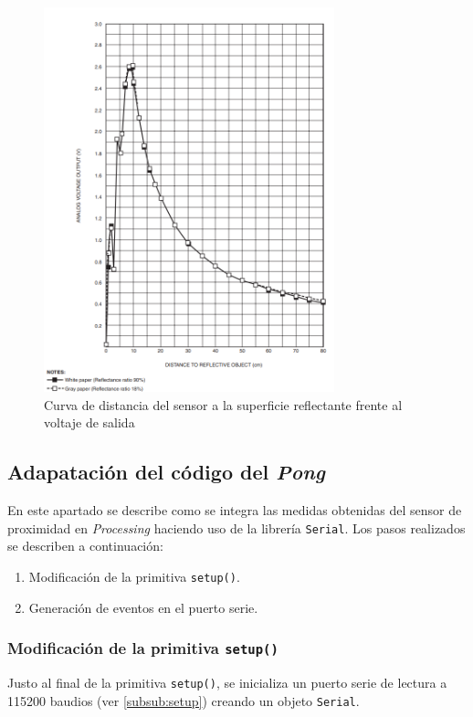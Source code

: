 \documentclass[10pt,a4paper]{report}
\begin{document}
	\begin{figure}[H]\label{fig:voltaje-max}
		\centering
		\includegraphics[width=0.75\textwidth]{volatje-max.png}
		\caption{Curva de distancia del sensor a la superficie reflectante frente al voltaje de salida}
	\end{figure}

	
	
	\subsection{Adapatación del código del \textit{Pong}}
	En este apartado se describe como se integra las medidas obtenidas del sensor de proximidad en \textit{Processing} haciendo uso de la librería \texttt{Serial}. Los pasos realizados se describen a continuación:
	
	\begin{enumerate}
		\item Modificación de la primitiva \texttt{setup()}.
		\item Generación de eventos en el puerto serie.
	\end{enumerate}
	
	\subsubsection{Modificación de la primitiva \texttt{setup()}}
	Justo al final de la primitiva \texttt{setup()}, se inicializa un puerto serie de lectura a 115200 baudios (ver \ref{subsub:setup}) creando un objeto \texttt{Serial}.
	
\end{document}
